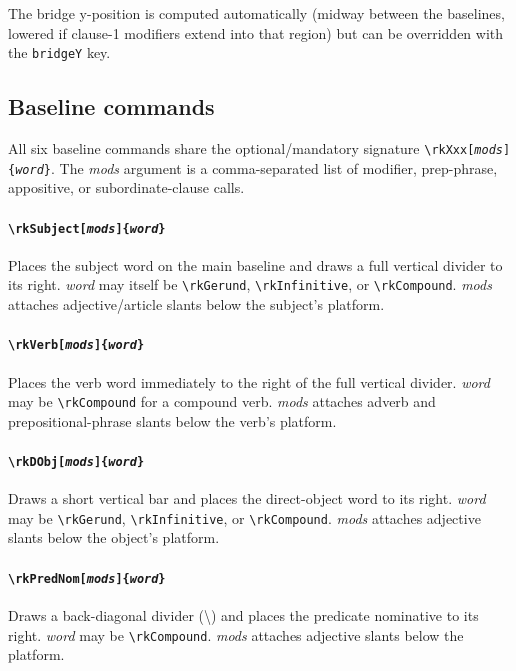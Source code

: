 \documentclass[11pt]{article}
\newcommand{\cmd}[1]{\texttt{\textbackslash #1}}
\newcommand{\opt}[1]{\texttt{#1}}
\begin{document}
\medskip\noindent
The bridge y-position is computed automatically (midway between the baselines,
lowered if clause-1 modifiers extend into that region) but can be overridden
with the \opt{bridgeY} key.

\subsection*{Baseline commands}

All six baseline commands share the optional/mandatory signature
\cmd{rkXxx[\textit{mods}]\{\textit{word}\}}.  The \textit{mods} argument is a
comma-separated list of modifier, prep-phrase, appositive, or subordinate-clause
calls.

\paragraph{\cmd{rkSubject[\textit{mods}]\{\textit{word}\}}}
Places the subject word on the main baseline and draws a full vertical divider
to its right.  \textit{word} may itself be \cmd{rkGerund}, \cmd{rkInfinitive},
or \cmd{rkCompound}.  \textit{mods} attaches adjective/article slants below the
subject's platform.

\paragraph{\cmd{rkVerb[\textit{mods}]\{\textit{word}\}}}
Places the verb word immediately to the right of the full vertical divider.
\textit{word} may be \cmd{rkCompound} for a compound verb.  \textit{mods}
attaches adverb and prepositional-phrase slants below the verb's platform.

\paragraph{\cmd{rkDObj[\textit{mods}]\{\textit{word}\}}}
Draws a short vertical bar and places the direct-object word to its right.
\textit{word} may be \cmd{rkGerund}, \cmd{rkInfinitive}, or \cmd{rkCompound}.
\textit{mods} attaches adjective slants below the object's platform.

\paragraph{\cmd{rkPredNom[\textit{mods}]\{\textit{word}\}}}
Draws a back-diagonal divider (\textbackslash) and places the predicate
nominative to its right.  \textit{word} may be \cmd{rkCompound}.
\textit{mods} attaches adjective slants below the platform.
\end{document}
